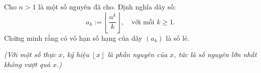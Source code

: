 \ifshowproblem
\begin{problem}\label{example:GBR-2015-TST-F2-P2}
    Cho \( n > 1 \) là một số nguyên đã cho.  
    Định nghĩa dãy số:
    \[
        a_k := \left\lfloor \frac{n^k}{k} \right\rfloor, \quad \text{với mỗi } k \ge 1.
    \]
    Chứng minh rằng có vô hạn số hạng của dãy \( (a_k) \) là số lẻ.
    
    \textit{(Với một số thực \( x \), ký hiệu \( \left\lfloor x \right\rfloor \) là phần nguyên của \( x \),
    tức là số nguyên lớn nhất không vượt quá \( x \).)}
\end{problem}
\fi

\fi
